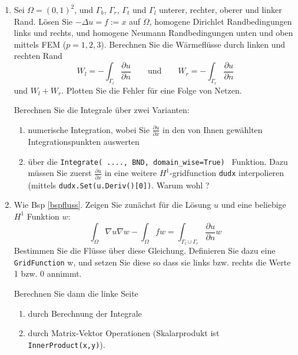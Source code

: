 \documentclass[11pt,a4paper]{report}
\begin{document}
\begin{enumerate}
\item \label{bspfluss} Sei $\Omega =(0,1)^2$, und $\Gamma_b$, $\Gamma_r$, $\Gamma_t$ und
  $\Gamma_l$ unterer, rechter, oberer und linker Rand. L\"osen Sie
  $-\Delta u = f := x$ auf $\Omega$, homogene Dirichlet Randbedingungen
  links und rechts, und homogene Neumann Randbedingungen unten und
  oben mittels FEM ($p=1,2,3$). Berechnen Sie die W\"armefl\"usse durch linken und
  rechten Rand
$$
W_l = - \int_{\Gamma_l} \frac{\partial u}{\partial n} \qquad \text{und} \qquad
W_r = - \int_{\Gamma_r} \frac{\partial u}{\partial n}
$$
und $W_l+W_r$. Plotten Sie die Fehler f\"ur eine Folge von Netzen.

Berechnen Sie die Integrale \"uber zwei Varianten:
\begin{enumerate}
\item numerische Integration, wobei Sie $\frac{\partial u}{\partial
    x}$ in den von Ihnen gew\"ahlten Integrationspunkten auswerten
\item \"uber die {\tt Integrate( ...., BND, domain\_wise=True) }
  Funktion. Dazu m\"ussen Sie zuerst $\frac{\partial u}{\partial x}$ in eine weitere
  $H^1$-gridfunction {\tt dudx} interpolieren (mittels {\tt dudx.Set(u.Deriv()[0])}. Warum wohl ?
\end{enumerate}

\vspace{15pt}


\item Wie Bsp \ref{bspfluss}. Zeigen Sie zun\"achst f\"ur die L\"osung
  $u$ und eine beliebige $H^1$ Funktion $w$:
$$
\int_\Omega \nabla u \nabla w - \int_\Omega f w = \int_{\Gamma_l \cup
  \Gamma_r}  \frac{\partial u}{\partial n} w
$$
Bestimmen Sie die Fl\"usse \"uber diese Gleichung. Definieren Sie dazu
eine {\tt GridFunction} w, und setzen Sie diese so dass sie links
bzw. rechts die Werte 1 bzw. 0 annimmt.

Berechnen Sie dann die linke Seite
\begin{enumerate}
\item durch Berechnung der Integrale
\item durch Matrix-Vektor Operationen (Skalarprodukt ist {\tt InnerProduct(x,y)}).
\end{enumerate}

\end{enumerate}
\end{document}

